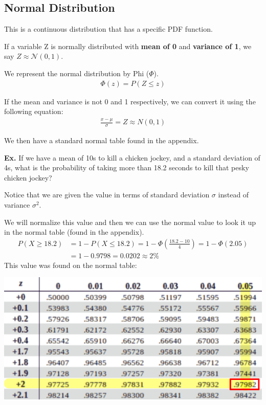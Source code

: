 \documentclass[12pt,letterpaper]{article} \usepackage{amsmath} \usepackage{graphicx} \usepackage[margin=1in]{geometry} \usepackage{longtable}  \usepackage{amssymb}
\begin{document}
	\subsection{Normal Distribution}
	This is a continuous distribution that has a specific PDF function.
	
	If a variable Z is normally distributed with \textbf{mean of 0} and \textbf{variance of 1}, we say $Z \approx \mathcal{N}(0,1)$.
	
	We represent the normal distribution by Phi ($\Phi$). 
	\begin{align*}
		\Phi(z) = P(Z\le z)
	\end{align*}

	If the mean and variance is not 0 and 1 respectively, we can convert it using the following equation:
	\begin{align*}
		\frac{x-\mu}{\sigma} = Z \approx N(0,1)
	\end{align*}

	We then have a standard normal table found in the appendix. 
	
	\begin{mdframed}
		\textbf{Ex. }If we have a mean of 10s to kill a chicken jockey, and a standard deviation of 4s, what is the probability of taking more than 18.2 seconds to kill that pesky chicken jockey?
		
		Notice that we are given the value in terms of standard deviation $\sigma$ instead of variance $\sigma^2$. 
		
		We will normalize this value and then we can use the normal value to look it up in the normal table (found in the appendix).
		\begin{align*}
			P(X\ge 18.2) &= 1-P(X\le 18.2) = 1-\Phi\left(\frac{18.2-10}{4}\right) = 1-\Phi\left(2.05\right) \\
			&= 1-0.9798=0.0202 \approx 2\%
		\end{align*}
		This value was found on the normal table:
		\begin{center}
			\includegraphics[width=0.5\linewidth]{normal-ex2}
		\end{center}
		
	\end{mdframed}
	
\end{document}

